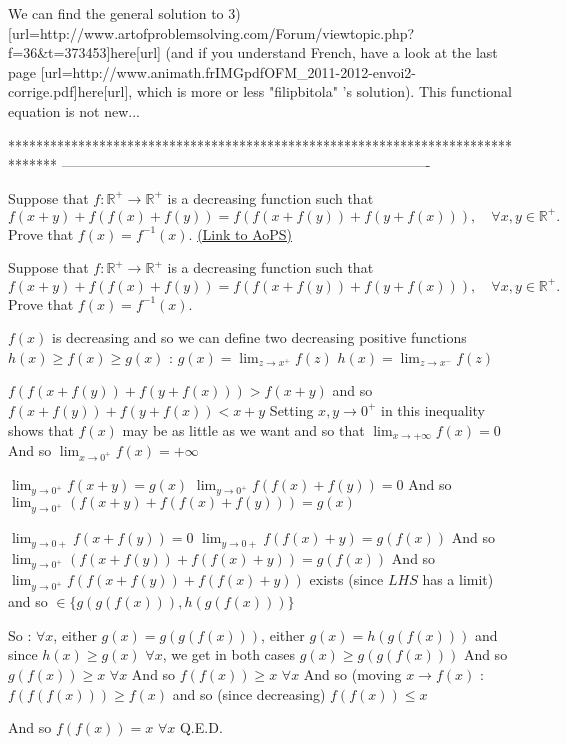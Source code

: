 \begin{solution}
	We can find the general solution to 3) [url=http://www.artofproblemsolving.com/Forum/viewtopic.php?f=36&t=373453]here[\/url] (and if you understand French, have a look at the last page [url=http://www.animath.fr\/IMG\/pdf\/OFM_2011-2012-envoi2-corrige.pdf]here[\/url], which is more or less "filipbitola" 's solution). This functional equation is not new...
\end{solution}
*******************************************************************************
-------------------------------------------------------------------------------

\begin{problem}
	Suppose that $f : \mathbb R^+ \to \mathbb R^+$ is a decreasing function such that
\[f(x+y)+f(f(x)+f(y))=f(f(x+f(y))+f(y+f(x))), \quad \forall x,y \in \mathbb R^+.\]
Prove that $f(x) = f^{-1}(x).$
	\flushright \href{https://artofproblemsolving.com/community/c6h475500}{(Link to AoPS)}
\end{problem}



\begin{solution}
	\begin{tcolorbox}Suppose that $f : \mathbb R^+ \to \mathbb R^+$ is a decreasing function such that
\[f(x+y)+f(f(x)+f(y))=f(f(x+f(y))+f(y+f(x))), \quad \forall x,y \in \mathbb R^+.\]
Prove that $f(x) = f^{-1}(x).$\end{tcolorbox}
$f(x)$ is decreasing and so we can define two decreasing positive functions $h(x)\ge f(x)\ge  g(x)$ :
$g(x)=\lim_{z\to x^+}f(z)$
$h(x)=\lim_{z\to x^-}f(z)$

$f(f(x+f(y))+f(y+f(x)))>f(x+y)$ and so $f(x+f(y))+f(y+f(x))<x+y$
Setting $x,y\to 0^+$ in this inequality shows that $f(x)$ may be as little as we want and so that $\lim_{x\to +\infty}f(x)=0$
And so $\lim_{x\to 0^+}f(x)=+\infty$

$\lim_{y\to 0^+}f(x+y)=g(x)$
$\lim_{y\to 0^+}f(f(x)+f(y))=0$
And so $\lim_{y\to 0^+}(f(x+y)+f(f(x)+f(y)))=g(x)$

$\lim_{y\to 0+}f(x+f(y))=0$
$\lim_{y\to 0+}f(f(x)+y)=g(f(x))$
And so $\lim_{y\to 0^+}(f(x+f(y))+f(f(x)+y))=g(f(x))$
And so $\lim_{y\to 0^+}f(f(x+f(y))+f(f(x)+y))$ exists (since $LHS$ has a limit) and so $\in\{g(g(f(x))),h(g(f(x)))\}$

So : $\forall x$, either $g(x)=g(g(f(x)))$, either $g(x)=h(g(f(x)))$ and since $h(x)\ge g(x)$ $\forall x$, we get in both cases $g(x)\ge g(g(f(x)))$ 
And so $g(f(x))\ge x$ $\forall x$
And so $f(f(x))\ge x$ $\forall x$
And so (moving $x\to f(x)$ : $f(f(f(x)))\ge f(x)$ and so (since decreasing) $f(f(x))\le x$

And so $f(f(x))=x$ $\forall x$
Q.E.D.
\end{solution}



